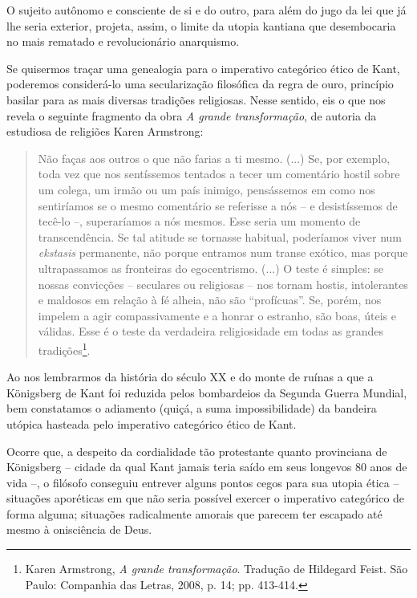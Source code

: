 O sujeito autônomo e consciente de si e do outro, para além do jugo da
lei que já lhe seria exterior, projeta, assim, o limite da utopia
kantiana que desembocaria no mais rematado e revolucionário anarquismo.

Se quisermos traçar uma genealogia para o imperativo categórico ético de
Kant, poderemos considerá-lo uma secularização filosófica da regra de
ouro, princípio basilar para as mais diversas tradições religiosas.
Nesse sentido, eis o que nos revela o seguinte fragmento da obra \emph{A
grande transformação}, de autoria da estudiosa de religiões Karen
Armstrong:

\begin{quote}
Não faças aos outros o que não farias a ti mesmo. (...) Se, por exemplo,
toda vez que nos sentíssemos tentados a tecer um comentário hostil sobre
um colega, um irmão ou um país inimigo, pensássemos em como nos
sentiríamos se o mesmo comentário se referisse a nós -- e desistíssemos
de tecê-lo --, superaríamos a nós mesmos. Esse seria um momento de
transcendência. Se tal atitude se tornasse habitual, poderíamos viver
num \emph{ekstasis} permanente, não porque entramos num transe exótico,
mas porque ultrapassamos as fronteiras do egocentrismo. (...) O teste é
simples: se nossas convicções -- seculares ou religiosas -- nos tornam
hostis, intolerantes e maldosos em relação à fé alheia, não são
``profícuas''. Se, porém, nos impelem a agir compassivamente e a honrar
o estranho, são boas, úteis e válidas. Esse é o teste da verdadeira
religiosidade em todas as grandes tradições\footnote{Karen Armstrong,
  \emph{A grande transformação}. Tradução de Hildegard Feist. São Paulo:
  Companhia das Letras, 2008, p. 14; pp. 413-414.}.
\end{quote}

Ao nos lembrarmos da história do século XX e do monte de ruínas a que a
Königsberg de Kant foi reduzida pelos bombardeios da Segunda Guerra
Mundial, bem constatamos o adiamento (quiçá, a suma impossibilidade) da
bandeira utópica hasteada pelo imperativo categórico ético de Kant.

Ocorre que, a despeito da cordialidade tão protestante quanto
provinciana de Königsberg -- cidade da qual Kant jamais teria saído em
seus longevos 80 anos de vida --, o filósofo conseguiu entrever alguns
pontos cegos para sua utopia ética -- situações aporéticas em que não
seria possível exercer o imperativo categórico de forma alguma;
situações radicalmente amorais que parecem ter escapado até mesmo à
onisciência de Deus.

